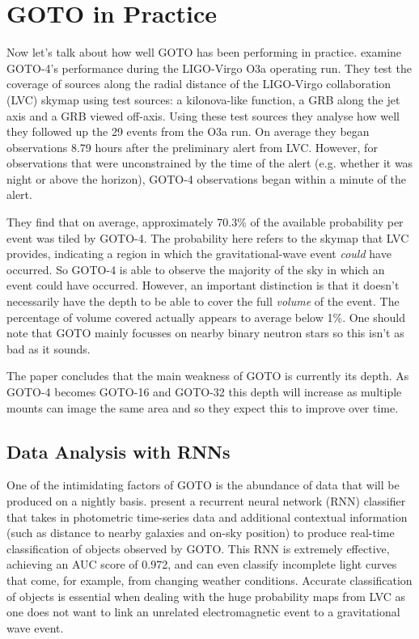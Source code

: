 \documentclass[twocolumn]{aastex631}
\begin{document}
\section{GOTO in Practice}
Now let's talk about how well GOTO has been performing in practice. \citet{Gompertz+2020} examine GOTO-4's performance during the LIGO-Virgo O3a operating run. They test the coverage of sources along the radial distance of the LIGO-Virgo collaboration (LVC) skymap using test sources: a kilonova-like function, a GRB along the jet axis and a GRB viewed off-axis. Using these test sources they analyse how well they followed up the 29 events from the O3a run. On average they began observations 8.79 hours after the preliminary alert from LVC. However, for observations that were unconstrained by the time of the alert (e.g. whether it was night or above the horizon), GOTO-4 observations began within a minute of the alert.

They find that on average, approximately 70.3\% of the available probability per event was tiled by GOTO-4. The probability here refers to the skymap that LVC provides, indicating a region in which the gravitational-wave event \textit{could} have occurred. So GOTO-4 is able to observe the majority of the sky in which an event could have occurred. However, an important distinction is that it doesn't necessarily have the depth to be able to cover the full \textit{volume} of the event. The percentage of volume covered actually appears to average below 1\%. One should note that GOTO mainly focusses on nearby binary neutron stars so this isn't as bad as it sounds.

The paper concludes that the main weakness of GOTO is currently its depth. As GOTO-4 becomes GOTO-16 and GOTO-32 this depth will increase as multiple mounts can image the same area and so they expect this to improve over time.

\subsection{Data Analysis with RNNs}
One of the intimidating factors of GOTO is the abundance of data that will be produced on a nightly basis. \citet{Burhanudin+2021} present a recurrent neural network (RNN) classifier that takes in photometric time-series data and additional contextual information (such as distance to nearby galaxies and on-sky position) to produce real-time classification of objects observed by GOTO. This RNN is extremely effective, achieving an AUC score of 0.972, and can even classify incomplete light curves that come, for example, from changing weather conditions. Accurate classification of objects is essential when dealing with the huge probability maps from LVC as one does not want to link an unrelated electromagnetic event to a gravitational wave event.
\end{document}
